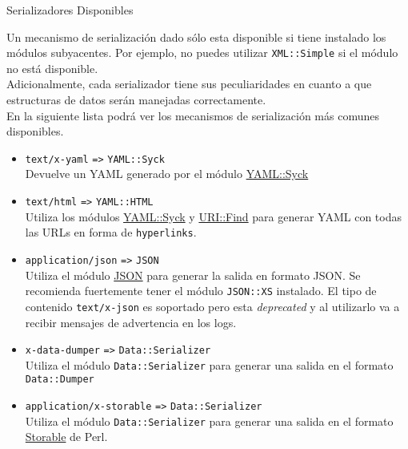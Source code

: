 \begin{frame}{Serializadores Disponibles} %

Un mecanismo de serialización dado sólo esta disponible si tiene instalado los
módulos subyacentes. Por ejemplo, no puedes utilizar \texttt{XML::Simple} si el
módulo no está disponible. \\[0.2cm]

Adicionalmente, cada serializador tiene sus peculiaridades en cuanto a que
estructuras de datos serán manejadas correctamente.\\

En la siguiente lista podrá ver los mecanismos de serialización más comunes
disponibles.

\begin{itemize}
    \item \texttt{text/x-yaml} \verb|=>| \texttt{YAML::Syck} \\
    Devuelve un YAML generado por el módulo \href{http://search.cpan.org/perldoc?YAML%3A%3ASyck}{YAML::Syck}

    \item  \texttt{text/html} \verb|=>| \texttt{YAML::HTML} \\
    Utiliza los módulos
    \href{http://search.cpan.org/perldoc?YAML%3A%3ASyck}{YAML::Syck} y
    \href{http://search.cpan.org/perldoc?URI%3A%3AFind}{URI::Find} para generar
    YAML con todas las URLs en forma de \texttt{hyperlinks}.


    \item \texttt{application/json} \verb|=>| \texttt{JSON} \\
    Utiliza el módulo \href{http://search.cpan.org/perldoc?JSON}{JSON} para
    generar la salida en formato JSON. Se recomienda fuertemente tener el
    módulo \texttt{JSON::XS} instalado. El tipo de contenido
    \texttt{text/x-json} es soportado pero esta \textit{deprecated} y al
    utilizarlo va a recibir mensajes de advertencia en los logs.

    \item \texttt{x-data-dumper} \verb|=>|  \texttt{Data::Serializer}\\
    Utiliza el módulo \texttt{Data::Serializer} para generar una salida en el
    formato \texttt{Data::Dumper}

    \item \texttt{application/x-storable} \verb|=>| \texttt{Data::Serializer}\\
    Utiliza el módulo \texttt{Data::Serializer} para generar una salida en el
    formato \href{http://search.cpan.org/perldoc?Storable}{Storable} de Perl.


\end{itemize}
\end{frame}
